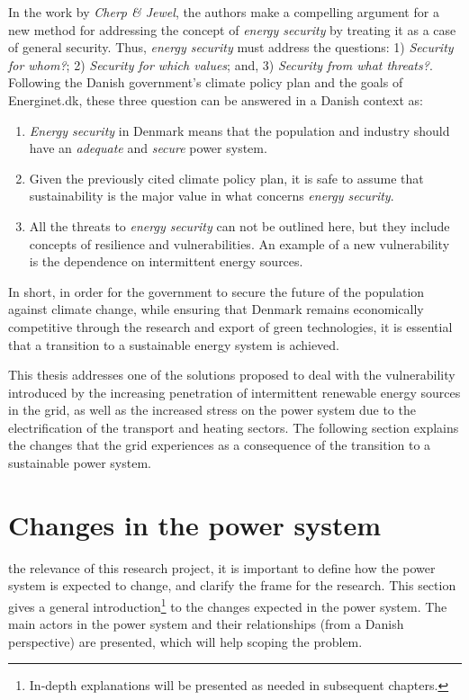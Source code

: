 In the work by \textit{Cherp \& Jewel}, the authors make a compelling argument for a new method for addressing the concept of \emph{energy security} by treating it as a case of general security. Thus, \emph{energy security} must address the questions: 1) \emph{Security for whom?}; 2) \emph{Security for which values}; and, 3) \emph{Security from what threats?}. Following the Danish government's climate policy plan and the goals of Energinet.dk, these three question can be answered in a Danish context as:
\begin{enumerate}
	\item \emph{Energy security} in Denmark means that the population and industry should have an \emph{adequate} and \emph{secure} power system.
	\item Given the previously cited climate policy plan, it is safe to assume that sustainability is the major value in what concerns \emph{energy security}.
	\item All the threats to \emph{energy security} can not be outlined here, but they include concepts of resilience and vulnerabilities. An example of a new vulnerability is the dependence on intermittent energy sources.
\end{enumerate}

In short, in order for the government to secure the future of the population against climate change, while ensuring that Denmark remains economically competitive through the research and export of green technologies, it is essential that a transition to a sustainable energy system is achieved. 

This thesis addresses one of the solutions proposed to deal with the vulnerability introduced by the increasing penetration of intermittent renewable energy sources in the grid, as well as the increased stress on the power system due to the electrification of the transport and heating sectors. The following section explains the changes that the grid experiences as a consequence of the transition to a sustainable power system.
\section{Changes in the power system}%
\label{sec:powsysdesc}
 the relevance of this research project, it is important to define how the power system is expected to change, and clarify the frame for the research. This section gives a general introduction\footnote{In-depth explanations will be presented as needed in subsequent chapters.} to the changes expected in the power system. The main actors in the power system and their relationships (from a Danish perspective) are presented, which will help scoping the problem.%
